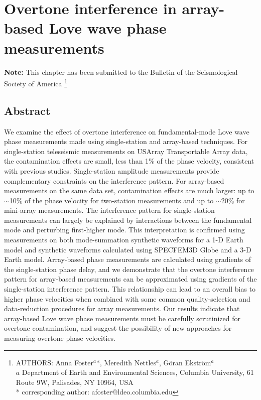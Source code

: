 \documentclass[12pt,oneside]{book}
\begin{document}
\singlespacing
\chapter{Overtone interference in array-based Love wave phase measurements}
\label{ch:ot}
\thispagestyle{fancy}
\normalsize
\doublespacing

\begin{raggedright}
{\bf Note:} This chapter has been submitted to the Bulletin of the Seismological Society of America
\footnote{AUTHORS: Anna Foster$^{a}$*, Meredith Nettles$^{a}$, G\"oran Ekstr\"om$^{a}$\\
$a$ Department of Earth and Environmental Sciences, Columbia University, 61 Route 9W, Palisades, NY 10964, USA\\
* corresponding author:  afoster@ldeo.columbia.edu}
\end{raggedright}
\normalsize

\section*{Abstract}
We examine the effect of overtone interference on fundamental-mode Love wave phase measurements made using single-station and array-based techniques. For single-station teleseismic measurements on USArray Transportable Array data, the contamination effects are small, less than 1\% of the phase velocity, consistent with previous studies. Single-station amplitude measurements provide complementary constraints on the interference pattern. For array-based measurements on the same data set, contamination effects are much larger: up to $\sim$10\% of the phase velocity for two-station measurements and up to $\sim$20\% for mini-array measurements. The interference pattern for single-station measurements can largely be explained by interactions between the fundamental mode and perturbing first-higher mode. This interpretation is confirmed using measurements on both mode-summation synthetic waveforms for a 1\nobreakdash-D Earth model and synthetic waveforms calculated using SPECFEM3D Globe and a 3\nobreakdash-D Earth model. Array-based phase measurements are calculated using gradients of the single-station phase delay, and we demonstrate that the overtone interference pattern for array-based measurements can be approximated using gradients of the single-station interference pattern. This relationship can lead to an overall bias to higher phase velocities when combined with some common quality-selection and data-reduction procedures for array measurements. Our results indicate that array-based Love wave phase measurements must be carefully scrutinized for overtone contamination, and suggest the possibility of new approaches for measuring overtone phase velocities. 
\end{document}
